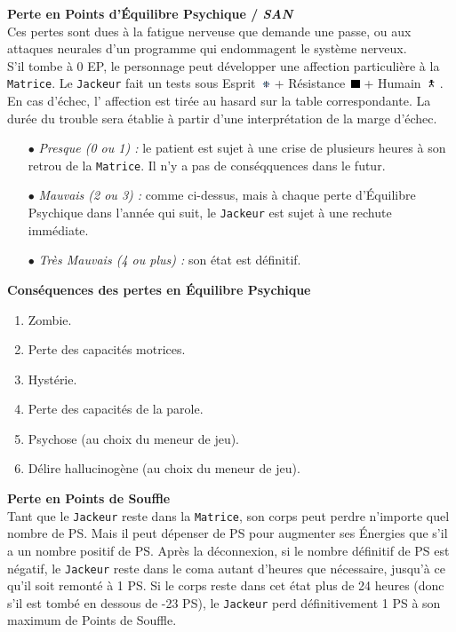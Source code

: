 \documentclass[11pt,twoside,a4paper]{article}
\def\imgESPRI{\includegraphics[width=0.25cm]{../../../../../imgGraphics/rolePlayingGame/SimulacreS/mini12x12/esprit.png} }
\def\imgRESIS{\includegraphics[width=0.25cm]{../../../../../imgGraphics/rolePlayingGame/SimulacreS/mini12x12/resistance.png} }
\def\imgHUMAI{\includegraphics[width=0.25cm]{../../../../../imgGraphics/rolePlayingGame/SimulacreS/mini12x12/humain.png} }
\begin{document}
\begin{multicols*}{2}

\textbf{Perte en Points d'{\'E}quilibre Psychique / \emph{SAN}}~\\
Ces pertes sont dues {\`a} la fatigue nerveuse que demande une passe, ou aux attaques neurales d'un programme qui endommagent le syst{\`e}me nerveux. ~\\
S'il tombe {\`a} 0 EP, le personnage peut d{\'e}velopper une affection particuli{\`e}re {\`a} la \texttt{Matrice}. Le \texttt{Jackeur} fait un tests sous Esprit~\imgESPRI  + R{\'e}sistance~\imgRESIS  + Humain~\imgHUMAI . En cas d'{\'e}chec, l'	affection est tir{\'e}e au hasard sur la table correspondante. La dur{\'e}e du trouble sera {\'e}tablie {\`a} partir d'une interpr{\'e}tation de la marge d'{\'e}chec. 
\begin{itemize}
	\item[$\bullet$] \emph{Presque (0 ou 1) : }le patient est sujet {\`a} une crise de plusieurs heures {\`a} son retrou de la \texttt{Matrice}. Il n'y a pas de cons{\'e}qquences dans le futur. 
	\item[$\bullet$] \emph{Mauvais (2 ou 3) : }comme ci-dessus, mais {\`a} chaque perte d'{\'E}quilibre Psychique dans l'ann{\'e}e qui suit, le \texttt{Jackeur} est sujet {\`a} une rechute imm{\'e}diate. 
	\item[$\bullet$] \emph{Tr{\`e}s Mauvais (4 ou plus) : }son {\'e}tat est d{\'e}finitif. 
\end{itemize}

\begin{center}
	\footnotesize
	\colorbox{verylightgrey}{ \parbox{0.950\linewidth}{  %
	\textbf{Cons{\'e}quences des pertes en {\'E}quilibre Psychique} ~\\
	\begin{enumerate}
		\item Zombie. 
		\item Perte des capacit{\'e}s motrices. 
		\item Hyst{\'e}rie. 
		\item Perte des capacit{\'e}s de la parole. 
		\item Psychose (au choix du meneur de jeu). 
		\item D{\'e}lire hallucinog{\`e}ne (au choix du meneur de jeu). 
	\end{enumerate} } } %
\end{center}

\textbf{Perte en Points de Souffle}~\\
Tant que le \texttt{Jackeur} reste dans la \texttt{Matrice}, son corps peut perdre n'importe quel nombre de PS. Mais il peut d{\'e}penser de PS pour augmenter ses {\'E}nergies que s'il a un nombre positif de PS. Apr{\`e}s la d{\'e}connexion, si le nombre d{\'e}finitif de PS est n{\'e}gatif, le \texttt{Jackeur} reste dans le coma autant d'heures que n{\'e}cessaire, jusqu'{\`a} ce qu'il soit remont{\'e} {\`a} 1 PS. Si le corps reste dans cet {\'e}tat plus de 24 heures (donc s'il est tomb{\'e} en dessous de -23 PS), le \texttt{Jackeur} perd d{\'e}finitivement 1 PS {\`a} son maximum de Points de Souffle. ~\\


\end{multicols*}
\end{document}
